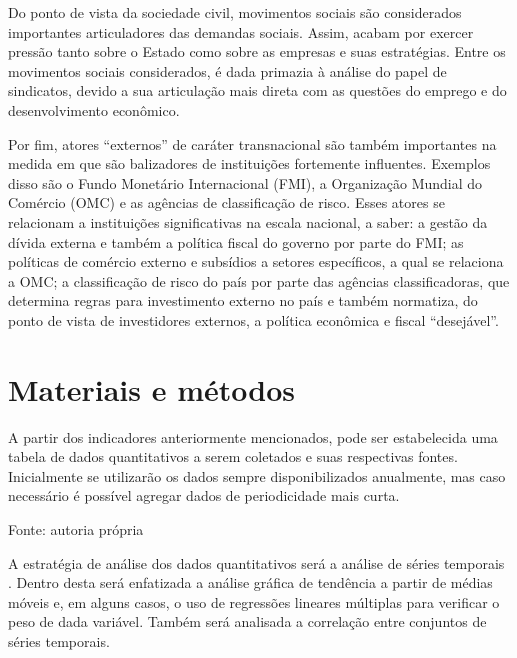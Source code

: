 Do ponto de vista da sociedade civil, movimentos sociais são
considerados importantes articuladores das demandas sociais. Assim,
acabam por exercer pressão tanto sobre o Estado como sobre as empresas e
suas estratégias. Entre os movimentos sociais considerados, é dada
primazia à análise do papel de sindicatos, devido a sua articulação mais
direta com as questões do emprego e do desenvolvimento econômico.

Por fim, atores ``externos'' de caráter transnacional são também
importantes na medida em que são balizadores de instituições fortemente
influentes. Exemplos disso são o Fundo Monetário Internacional (FMI), a
Organização Mundial do Comércio (OMC) e as agências de classificação de
risco. Esses atores se relacionam a instituições significativas na
escala nacional, a saber: a gestão da dívida externa e também a
política fiscal do governo por parte do FMI; as políticas de comércio
externo e subsídios a setores específicos, a qual se relaciona a OMC; a
classificação de risco do país por parte das agências classificadoras,
que determina regras para investimento externo no país e também
normatiza, do ponto de vista de investidores externos, a política
econômica e fiscal ``desejável''.

\section{Materiais e métodos}\label{materiais-e-muxe9todos}

A partir dos indicadores anteriormente mencionados, pode ser
estabelecida uma tabela de dados quantitativos a serem coletados e suas
respectivas fontes. Inicialmente se utilizarão os dados sempre
disponibilizados anualmente, mas caso necessário é possível agregar
dados de periodicidade mais curta.

\begin{table}[htbp]
\centering
\caption{Indicadores quantitativos e fontes}
\label{tab:cap03-indicadores-quantitativos}
\end{table}

Fonte: autoria própria

A estratégia de análise dos dados quantitativos será a análise de
séries temporais . Dentro desta será enfatizada a
análise gráfica de tendência a partir de médias móveis e, em alguns
casos, o uso de regressões lineares múltiplas para verificar o peso de
dada variável. Também será analisada a correlação entre conjuntos de
séries temporais.

